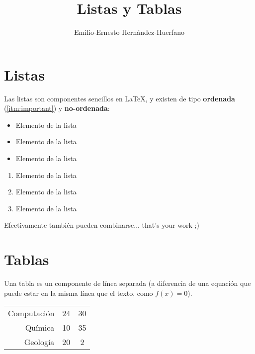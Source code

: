 \documentclass[12pt,letterpaper,oneside]{article}
\title{Listas y Tablas}
\author{Emilio-Ernesto Hernández-Huerfano}
\begin{document}
\maketitle

\section*{Listas}

\noindent Las listas son componentes sencillos en \LaTeX, y existen de tipo \textbf{ordenada} (\ref{itm:important}) y \textbf{no-ordenada}:

\begin{multicols}{2}

\begin{itemize} \label{prop:unorderedlist}
	\item Elemento de la lista
	\item Elemento de la lista
	\item Elemento de la lista
\end{itemize}

\columnbreak

\begin{enumerate} \label{prop:orderedlist}
	\item Elemento de la lista
	\item\label{itm:important} Elemento de la lista
	\item Elemento de la lista
\end{enumerate}

\end{multicols}

Efectivamente también pueden combinarse... that's your work ;)


\section*{Tablas}

\noindent Una tabla es un componente de línea separada (a diferencia de una equación que puede estar en la misma línea que el texto, como $f(x)=0$).

\begin{center}
\begin{tabular}{r c c }
 Computación & 24 & 30 \\ 
 Química & 10 & 35 \\ 
 Geología & 20 & 2 \\ 
\end{tabular}
\end{center}
\end{document}
